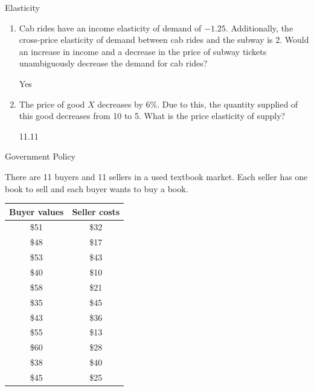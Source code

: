 \documentclass[pdf, handout]{beamer}
\begin{document}
\begin{frame}{Elasticity}
	
	\begin{enumerate}
		\item 	Cab rides have an income elasticity of demand of $-1.25$. Additionally, the cross-price elasticity of demand between cab rides and the subway is 2. Would an increase in income and a decrease in the price of subway tickets unambiguously decrease the demand for cab rides? 
		
		\pause
		\begin{flushright}
			
			\color{red} Yes
		\end{flushright}
		
		\pause 
		
		\item The price of good $X$ decreases by 6\%. Due to this, the quantity supplied of this good decreases from 10 to 5. What is the price elasticity of supply? 
		
		\pause
		\begin{flushright}
			
			\color{red} 11.11
		\end{flushright}
		
	\end{enumerate}
	
\end{frame}

\begin{frame}{Government Policy}
	
There are 11 buyers and 11 sellers in a used textbook market. Each seller has one book to sell and each buyer wants to buy a book. 

\begin{table}[ht]
	\centering
	\begin{tabular}{ c | c }        
		
		Buyer values   & Seller costs \\
		\hline
		\$51 & \$32 \\
		\$48 & \$17 \\
		\$53 & \$43 \\
		\$40 & \$10 \\
		\$58& \$21 \\
		\$35 & \$45 \\
		\$43 & \$36 \\
		\$55 & \$13 \\
		\$60 & \$28 \\
		\$38 & \$40 \\
		\$45 & \$25 
	\end{tabular}
\end{table}

\end{frame}
\end{document}
